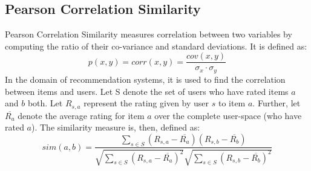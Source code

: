 \subsection{Pearson Correlation Similarity}
Pearson Correlation Similarity measures correlation between two variables by computing the ratio of their co-variance and standard deviations. It is defined as:
\begin{equation}
p(x, y)=corr(x, y)=\frac{cov(x, y)}{\sigma_x\cdot\sigma_y} \nonumber
\end{equation}
In the domain of recommendation systems, it is used to find the correlation between items and users. Let S denote the set of users who have rated items $a$ and $b$ both. Let $R_{s,a}$ represent the rating given by user $s$ to item $a$. Further, let $\overline{R_a}$ denote the average rating for item $a$ over the complete user-space (who have rated $a$). The similarity measure is, then, defined as:
\begin{equation}
sim(a,b)=\frac{\sum_{s\in S} (R_{s,a}-\overline{R_a})(R_{s,b}-\overline{R_b})}{\sqrt{\sum_{s\in S} (R_{s,a}-\overline{R_a})^2}\sqrt{\sum_{s\in S} (R_{s,b}-\overline{R_b})^2}}
\end{equation}



